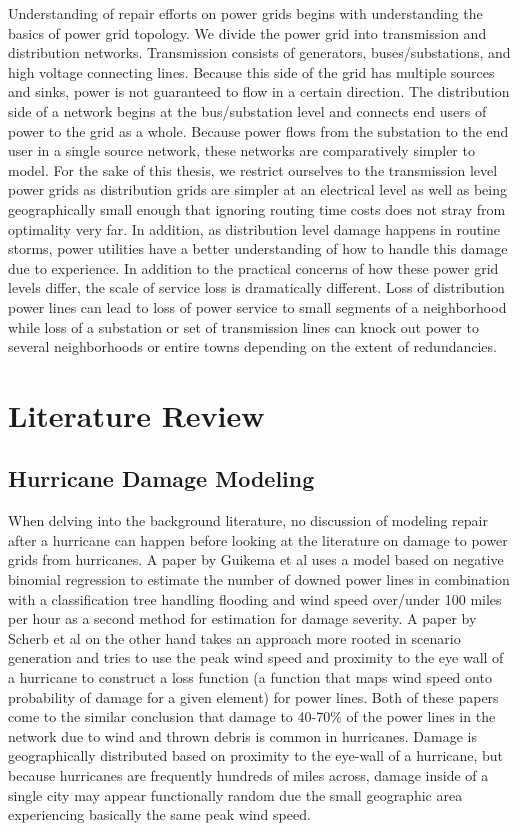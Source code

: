 \documentclass{article}
\begin{document}
	Understanding of repair efforts on power grids begins with understanding the basics of power grid topology. We divide the power grid into transmission and distribution networks. Transmission consists of generators, buses/substations, and high voltage connecting lines. Because this side of the grid has multiple sources and sinks, power is not guaranteed to flow in a certain direction. The distribution side of a network begins at the bus/substation level and connects end users of power to the grid as a whole. Because power flows from the substation to the end user in a single source network, these networks are comparatively simpler to model. For the sake of this thesis, we restrict ourselves to the transmission level power grids as distribution grids are simpler at an electrical level as well as being geographically small enough that ignoring routing time costs does not stray from optimality very far. In addition, as distribution level damage happens in routine storms, power utilities have a better understanding of how to handle this damage due to experience. In addition to the practical concerns of how these power grid levels differ, the scale of service loss is dramatically different. Loss of distribution power lines can lead to loss of power service to small segments of a neighborhood while loss of a substation or set of transmission lines can knock out power to several neighborhoods or entire towns depending on the extent of redundancies.
	
	
	\section{Literature Review}
	\subsection{Hurricane Damage Modeling}
		When delving into the background literature, no discussion of modeling repair after a hurricane can happen before looking at the literature on damage to power grids from hurricanes. A paper by Guikema et al\cite{GuikemaEA2010} uses a model based on negative binomial regression to estimate the number of downed power lines in combination with a classification tree handling flooding and wind speed over/under 100 miles per hour as a second method for estimation for damage severity. A paper by Scherb et al \cite{ScherbEA2015} on the other hand takes an approach more rooted in scenario generation and tries to use the peak wind speed and proximity to the eye wall of a hurricane to construct a loss function (a function that maps wind speed onto probability of damage for a given element) for power lines. Both of these papers come to the similar conclusion that damage to 40-70\% of the power lines in the network due to wind and thrown debris is common in hurricanes. Damage is geographically distributed based on proximity to the eye-wall of a hurricane, but because hurricanes are frequently hundreds of miles across, damage inside of a single city may appear functionally random due the small geographic area experiencing basically the same peak wind speed. 
		
\end{document}
